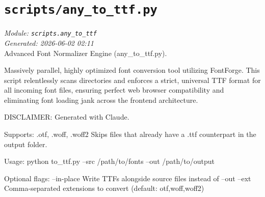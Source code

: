 
\section{\texttt{scripts/any\_to\_ttf.py}}
\textit{Module: \texttt{scripts.any\_to\_ttf}} \\
\textit{Generated: 2026-06-02 02:11} \\

Advanced Font Normalizer Engine (any\_to\_ttf.py).

Massively parallel, highly optimized font conversion tool utilizing
FontForge. This script relentlessly scans directories and enforces a
strict, universal TTF format for all incoming font files, ensuring
perfect web browser compatibility and eliminating font loading jank
across the frontend architecture.

DISCLAIMER: Generated with Claude.

Supports: .otf, .woff, .woff2 Skips files that already have a .ttf
counterpart in the output folder.

Usage: python to\_ttf.py --src /path/to/fonts --out /path/to/output

Optional flags: --in-place Write TTFs alongside source files instead of
--out --ext Comma-separated extensions to convert (default:
otf,woff,woff2)
